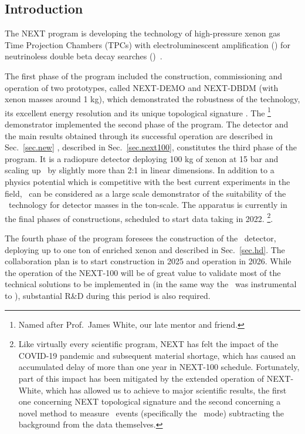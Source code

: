 \subsection{Introduction}

The NEXT program is developing the technology of high-pressure xenon gas Time Projection Chambers (TPCs) with electroluminescent amplification (\HPXeEL) for neutrinoless double beta decay searches (\bbonu)~\cite{Alvarez:2012haa, Gomez-Cadenas:2019sfa}. 

The first phase of the program included the construction, commissioning and operation of two prototypes, called NEXT-DEMO and NEXT-DBDM (with xenon masses around 1 kg), which demonstrated the robustness of the technology, its excellent energy resolution and its unique topological signature \cite{Alvarez:2012xda, Alvarez:2013gxa, Alvarez:2012hh, Ferrario:2015kta}. The \NEW\footnote{Named after Prof.~James White, our late mentor and friend.} demonstrator implemented the second phase of the program. The detector and the main results obtained through its successful operation are described in Sec.~\ref{sec.new} \Next, described in Sec.~\ref{sec.next100}, constitutes the third phase of the program. It is a radiopure detector deploying 100 kg of xenon at 15 bar and scaling up \NEW\ by slightly more than 2:1 in linear dimensions. In addition to a physics potential which is competitive with the best current experiments in the field, \Next\ can be considered as a large scale demonstrator of the suitability of the \HPXeEL\ technology for detector masses in the ton-scale. The apparatus is currently in the final phases of constructions, scheduled to start data taking in 2022.
\footnote{
Like virtually every scientific program, NEXT has felt the impact of the COVID-19 pandemic and subsequent material shortage, which has caused an accumulated delay of more than one year in NEXT-100 schedule. Fortunately, part of this impact has been mitigated by the extended operation of NEXT-White, which has allowed us to achieve to major scientific results, the first one concerning NEXT topological signature and the second concerning a novel method to measure \bb\ events
(specifically the \bbtnu\ mode) subtracting the background from the data themselves.}. 

The fourth phase of the program foresees the construction of the \NHD\ detector, deploying up to one ton of enriched xenon and described in Sec.~\ref{sec.hd}. The collaboration plan is to start construction in 2025 and operation in 2026. While the operation of the NEXT-100 will be of great value to validate most of the technical solutions to be implemented in \NHD (in the same way the \NEW\ was instrumental to \Next), substantial R\&D during this period is also required. 

